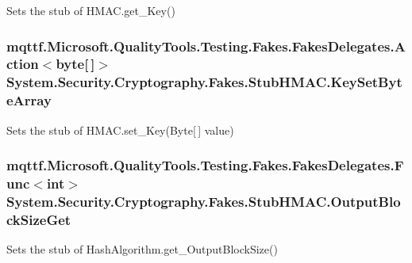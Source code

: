 Sets the stub of H\-M\-A\-C.\-get\-\_\-\-Key()

\hypertarget{class_system_1_1_security_1_1_cryptography_1_1_fakes_1_1_stub_h_m_a_c_a996bb5f413b62efafc6c990c57824707}{
\subsubsection[{Key\-Set\-Byte\-Array}]{\setlength{\rightskip}{0pt plus 5cm}mqttf.\-Microsoft.\-Quality\-Tools.\-Testing.\-Fakes.\-Fakes\-Delegates.\-Action$<$byte\mbox{[}$\,$\mbox{]}$>$ System.\-Security.\-Cryptography.\-Fakes.\-Stub\-H\-M\-A\-C.\-Key\-Set\-Byte\-Array}}\label{class_system_1_1_security_1_1_cryptography_1_1_fakes_1_1_stub_h_m_a_c_a996bb5f413b62efafc6c990c57824707}


Sets the stub of H\-M\-A\-C.\-set\-\_\-\-Key(\-Byte\mbox{[}$\,$\mbox{]} value)

\hypertarget{class_system_1_1_security_1_1_cryptography_1_1_fakes_1_1_stub_h_m_a_c_a91941999266258a4c390209007d0621c}{
\subsubsection[{Output\-Block\-Size\-Get}]{\setlength{\rightskip}{0pt plus 5cm}mqttf.\-Microsoft.\-Quality\-Tools.\-Testing.\-Fakes.\-Fakes\-Delegates.\-Func$<$int$>$ System.\-Security.\-Cryptography.\-Fakes.\-Stub\-H\-M\-A\-C.\-Output\-Block\-Size\-Get}}\label{class_system_1_1_security_1_1_cryptography_1_1_fakes_1_1_stub_h_m_a_c_a91941999266258a4c390209007d0621c}


Sets the stub of Hash\-Algorithm.\-get\-\_\-\-Output\-Block\-Size()



